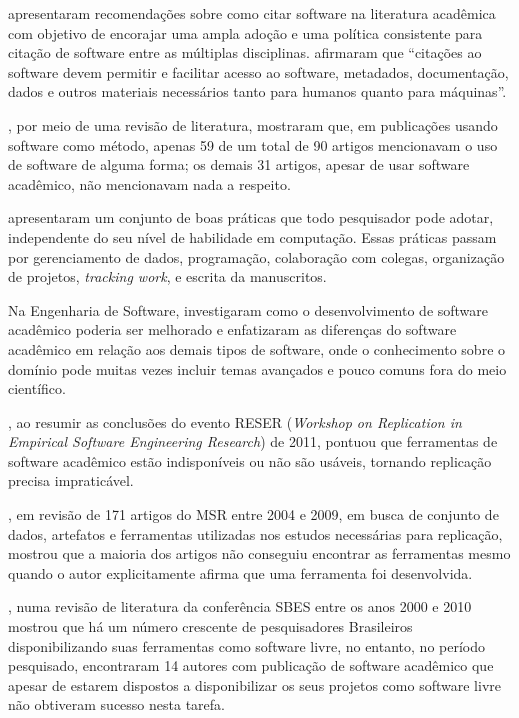  apresentaram recomendações sobre como citar software
na literatura acadêmica com objetivo de encorajar uma ampla adoção e uma
política consistente para citação de software entre as múltiplas disciplinas.
%
 afirmaram que ``citações ao software devem
permitir e facilitar acesso ao software, metadados, documentação, dados e
outros materiais necessários tanto para humanos quanto para máquinas''.

,
por meio de uma  revisão de literatura, mostraram que,
em  publicações usando software como
método, apenas 59 de um total de 90 artigos mencionavam o uso de software de alguma forma;
os demais 31 artigos, apesar de usar software acadêmico, não mencionavam nada a
respeito.

 apresentaram um conjunto de boas práticas que todo
pesquisador pode adotar, independente do seu nível de habilidade em
computação. Essas práticas passam por gerenciamento de dados, programação,
colaboração com colegas, organização de projetos, {\it tracking work}, e escrita da
manuscritos.


Na Engenharia de Software, 
investigaram como o desenvolvimento de software acadêmico poderia ser melhorado e
enfatizaram as diferenças do software acadêmico em relação aos demais tipos de
software, onde o conhecimento sobre o domínio pode muitas vezes incluir temas
avançados e pouco comuns fora do meio científico.

,
ao resumir as conclusões do evento RESER ({\it Workshop on Replication in Empirical
Software Engineering Research}) de 2011, pontuou que ferramentas de software
acadêmico estão indisponíveis ou não são usáveis, tornando
replicação precisa impraticável.

, em revisão de 171 artigos do MSR entre 2004 e 2009,
em busca de conjunto de dados, artefatos e ferramentas utilizadas nos estudos
necessárias para replicação, mostrou que a maioria dos artigos não conseguiu encontrar
as ferramentas mesmo quando o autor explicitamente afirma que uma ferramenta foi desenvolvida.

, numa revisão de literatura da conferência SBES entre
os anos 2000 e 2010 mostrou que há um número crescente de pesquisadores
Brasileiros disponibilizando suas ferramentas como software livre, no entanto,
no período pesquisado, encontraram 14 autores com publicação de software acadêmico
que apesar de estarem dispostos a disponibilizar os seus projetos como software
livre não obtiveram sucesso nesta tarefa.

